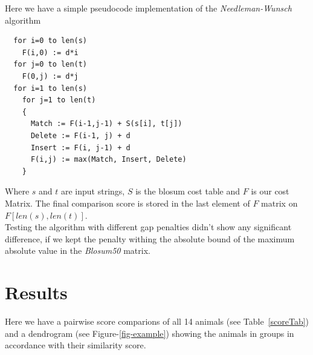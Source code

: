 \documentclass[a4paper,11pt]{article}
\begin{document}
Here we have a simple pseudocode implementation of the \textit{Needleman-Wunsch} algorithm

\begin{lstlisting}
  for i=0 to len(s)
    F(i,0) := d*i
  for j=0 to len(t)
    F(0,j) := d*j
  for i=1 to len(s)
    for j=1 to len(t)
    {
      Match := F(i-1,j-1) + S(s[i], t[j])
      Delete := F(i-1, j) + d
      Insert := F(i, j-1) + d
      F(i,j) := max(Match, Insert, Delete)
    }
\end{lstlisting}
Where $s$ and $t$ are input strings, $S$ is the blosum cost table and $F$ is our cost Matrix. The final comparison score is stored in the last element of $F$ matrix on $F[len(s),len(t)]$.\\

Testing the algorithm with different gap penalties didn't show any significant difference, if we kept the penalty withing the absolute bound of the maximum absolute value in the \textit{Blosum50} matrix. 


\section{Results}

Here we have a pairwise score comparions of all 14 animals (see Table~\ref{scoreTab}) and a dendrogram (see Figure-\ref{fig-example}) showing the animals in groups in accordance with their similarity score.
\end{document}

